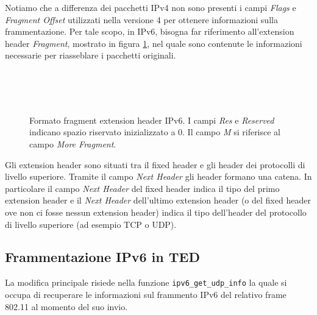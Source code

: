 \documentclass[a4paper,10pt]{article}
\begin{document}
Notiamo che a differenza dei pacchetti IPv4 non sono presenti i campi
\emph{Flags} e \emph{Fragment Offset} utilizzati nella versione 4 per
ottenere informazioni sulla frammentazione. Per tale scopo, in IPv6, bisogna far
riferimento all'extension header \emph{Fragment}, mostrato in figura
\ref{fig:fragmenthdr}, nel quale sono
contenute le informazioni necessarie per riasseblare i pacchetti
originali.
\begin{figure} [H]
	\begin{center}
		\begin{bytefield}[bitwidth=1.1em]{32}
			\\
			
			 \\

			 \\
		\end{bytefield}
		\caption{Formato fragment extension header IPv6.
I campi \emph{Res} e
\emph{Reserved} indicano spazio riservato inizializzato a 0. Il campo
\emph{M} si riferisce al campo \emph{More Fragment}.}
		\label{fig:fragmenthdr}
	\end{center}
\end{figure}
Gli extension header sono situati tra il fixed header e gli header dei
protocolli di livello superiore. Tramite il campo \emph{Next Header} gli header
formano una catena. In particolare il campo \emph{Next Header} del fixed
header indica il tipo del primo extension header e il \emph{Next Header}
dell'ultimo extension header (o del fixed header ove non ci fosse nessun
extension header) indica il tipo dell'header del protocollo di livello
superiore (ad esempio TCP o UDP).
\newpage
\subsection{Frammentazione IPv6 in TED}
La modifica principale risiede nella funzione
\texttt{ipv6\_get\_udp\_info} la quale si occupa di recuperare le
informazioni sul frammento IPv6 del relativo frame 802.11
 al momento del suo invio.\\
\end{document}
